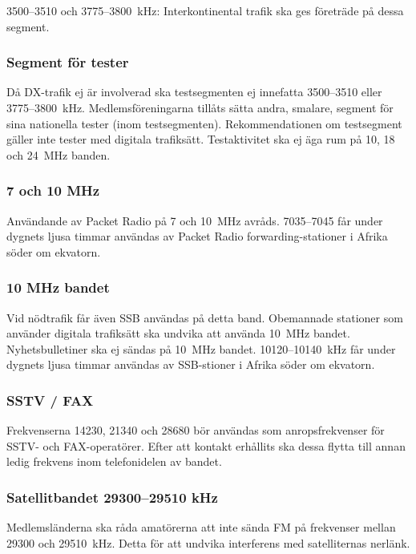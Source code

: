 3500--3510 och 3775--3800~kHz:
Interkontinental trafik ska ges företräde på dessa segment.

\subsubsection{Segment för tester}

Då DX-trafik ej är involverad ska testsegmenten ej innefatta
3500--3510 eller 3775--3800~kHz. Medlemsföreningarna tillåts
sätta andra, smalare, segment för sina nationella tester
(inom testsegmenten).
Rekommendationen om testsegment gäller inte tester med digitala trafiksätt.
Testaktivitet ska ej äga rum på 10, 18 och 24~MHz banden.

\subsubsection{7 och 10 MHz}

Användande av Packet Radio på 7 och 10~MHz avråds.
7035--7045 får under dygnets ljusa timmar användas av
Packet Radio forwarding-stationer i Afrika söder om
ekvatorn.

\subsubsection{10 MHz bandet}

Vid nödtrafik får även SSB användas på detta band.
Obemannade stationer som använder digitala trafiksätt ska undvika att
använda 10~MHz bandet.
Nyhetsbulletiner ska ej sändas på 10~MHz bandet.
10120--10140~kHz får under dygnets ljusa timmar användas av
SSB-stioner i Afrika söder om ekvatorn.

\subsubsection{SSTV / FAX}

Frekvenserna 14230, 21340 och 28680 bör användas
som anropsfrekvenser för SSTV- och FAX-operatörer.
Efter att kontakt erhållits ska dessa flytta till annan
ledig frekvens inom telefonidelen av bandet.

\subsubsection{Satellitbandet 29300--29510 kHz}

Medlemsländerna ska råda amatörerna att inte sända
FM på frekvenser mellan 29300 och 29510~kHz. Detta
för att undvika interferens med satelliternas nerlänk.

